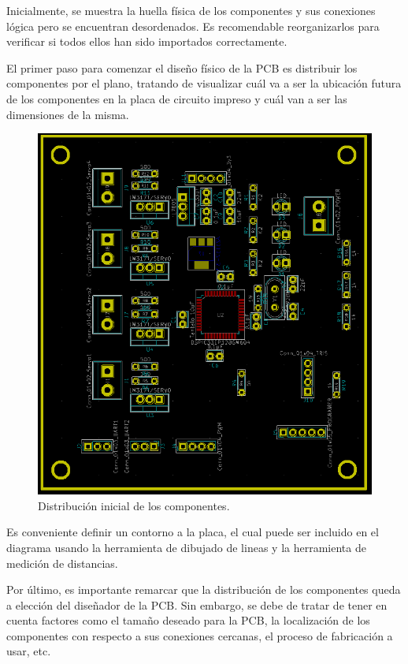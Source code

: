 Inicialmente, se muestra la huella física de los componentes y sus conexiones lógica pero se encuentran desordenados. Es recomendable reorganizarlos para verificar si todos ellos han sido importados correctamente.

El primer paso para comenzar el diseño físico de la \ac{PCB} es distribuir los componentes por el plano, tratando de visualizar cuál va a ser la ubicación futura de los componentes en la placa de circuito impreso y cuál van a ser las dimensiones de la misma.

\begin{figure}[H]
\centering 
\includegraphics[width=0.9\linewidth]{pictures/DistribucionFinal.PNG}
\caption{Distribución inicial de los componentes.}
\end{figure}

Es conveniente definir un contorno a la placa, el cual puede ser incluido en el diagrama usando la herramienta de dibujado de lineas y la herramienta de medición de distancias.

Por último, es importante remarcar que la distribución de los componentes queda a elección del diseñador de la \ac{PCB}. Sin embargo, se debe de tratar de tener en cuenta factores como el tamaño deseado para la \ac{PCB}, la localización de los componentes con respecto a sus conexiones cercanas, el proceso de fabricación a usar, etc.

